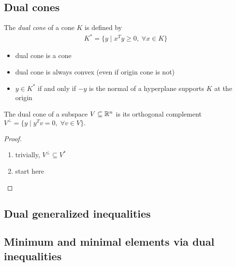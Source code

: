 \subsection{Dual cones}
The \textit{dual cone} of a cone $K$ is defined by
\begin{align}
  K^\ast=\{y\mid x^Ty\ge 0,\;\forall x\in K\}
\end{align}
\begin{itemize}
  \item dual cone is a cone
  \item dual cone is always convex (even if origin cone is not)
  \item $y\in K^\ast$ if and only if $-y$ is the normal of a hyperplane supports $K$ at the origin
\end{itemize}
\begin{example}
  The dual cone of a subspace $V\subseteq \mathbb{R}^n$ is its orthogonal complement $V^\perp=\{y\mid y^Tv=0,\;\forall v\in V\}.$
  \begin{proof}
    $ $
    \begin{enumerate}[label=(\roman*)]
      \item trivially, $V^\perp\subseteq V^\ast$
      \item start here
    \end{enumerate}
  \end{proof}
\end{example}
\begin{example}

\end{example}
\begin{example}
\end{example}
\begin{example}
\end{example}

\subsection{Dual generalized inequalities}
\begin{example}
\end{example}

\subsection{Minimum and minimal elements via dual inequalities}
\begin{example}
\end{example}
